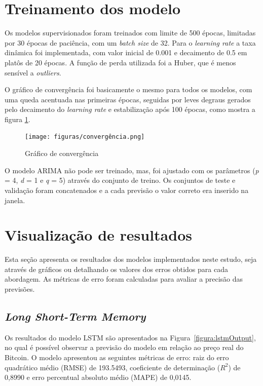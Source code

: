 \section{Treinamento dos modelo}
Os modelos supervisionados foram treinados com limite de 500 épocas, limitadas por 30 épocas de paciência, com um \textit{batch size} de 32.
Para o \textit{learning rate} a taxa dinâmica foi implementada, com valor inicial de 0.001 e decaimento de 0.5 em platôs de 20 épocas.
A função de perda utilizada foi a Huber, que é menos sensível a \textit{outliers}.

O gráfico de convergência foi basicamente o mesmo para todos os modelos, com uma queda acentuada nas primeiras épocas, seguidas por leves degraus gerados pelo decaimento do \textit{learning rate}
e estabilização após 100 épocas, como mostra a figura \ref{figura:convergencia}.

\begin{figure}[!htb] \centering
    \caption{Gráfico de convergência} \label{figura:convergencia}
    \begin{varwidth}{\linewidth}
      \texttt{[image: figuras/convergência.png]}
    \end{varwidth}
  \end{figure}

O modelo ARIMA não pode ser treinado, mas, foi ajustado com os parâmetros (\textit{p} = 4, \textit{d} = 1 e \textit{q} = 5) através do conjunto de treino. Os conjuntos de teste e validação foram concatenados e a cada previsão o valor correto era inserido na janela.

\section{Visualização de resultados}
Esta seção apresenta os resultados dos modelos implementados neste estudo, seja através de gráficos ou detalhando os valores dos erros obtidos para cada abordagem. As métricas de erro foram calculadas para avaliar a precisão das previsões.

\subsection{\textit{Long Short-Term Memory}}

Os resultados do modelo LSTM são apresentados na Figura~\ref{figura:lstmOutput}, no qual é possível observar a previsão do modelo em relação ao preço real do Bitcoin. O modelo apresentou as seguintes métricas de erro: raiz do erro quadrático médio (RMSE) de 193.5493, coeficiente de determinação ($R^2$) de 0,8990 e erro percentual absoluto médio (MAPE) de 0,0145.

